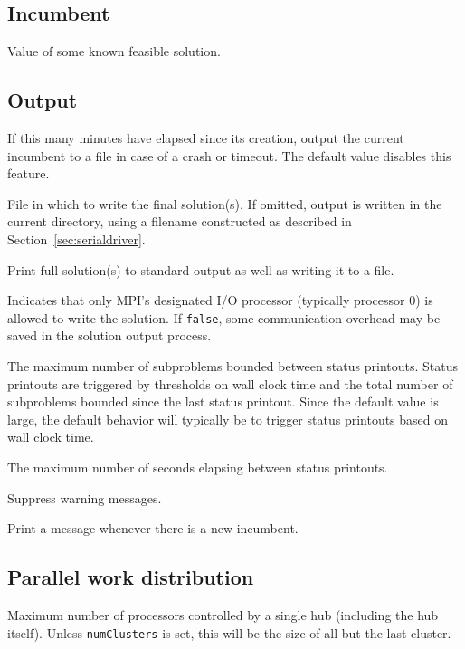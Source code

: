 \subsection{Incumbent}
\vspace{-3ex}
Value of some known feasible solution.

\subsection{Output}
\label{sec:outputparams}
\vspace{-3ex}
If this many minutes have elapsed since its creation,
output the current incumbent to a file in case of
a crash or timeout.  The default value disables this
feature.

File in which to write the final solution(s).  If omitted, output is
written in the current directory, using a filename constructed as
described in Section~\ref{sec:serialdriver}.

Print full solution(s) to standard output as well as writing it to a file.

 Indicates that only
MPI's designated I/O processor (typically processor 0) is allowed to
write the solution.  If \texttt{false}, some communication overhead
may be saved in the solution output process.

The maximum number of subproblems bounded between status printouts.
Status printouts are triggered by thresholds on wall clock time and the
total number of subproblems bounded since the last status printout.
Since the default value is large, the default behavior will typically
be to trigger status printouts based on wall clock time.

The maximum number of seconds elapsing between status printouts.

Suppress warning messages.

Print a message whenever there is a new incumbent.

\subsection{Parallel work distribution}
\vspace{-3ex}
Maximum number of processors controlled by a single hub (including the
hub itself).  Unless \texttt{numClusters} is set, this will be the
size of all but the last cluster.

